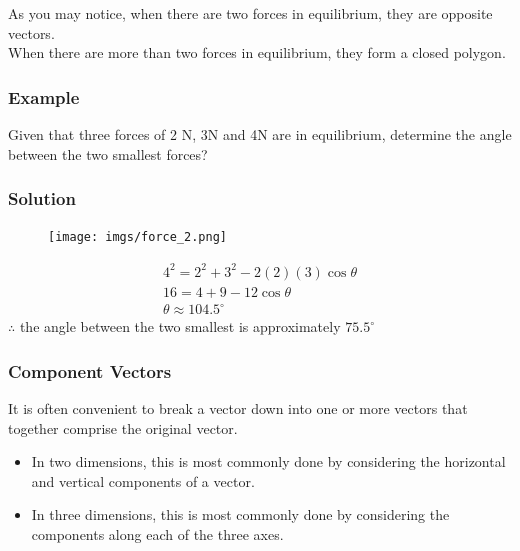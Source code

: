 \documentclass{article}
\begin{document}
As you may notice, when there are two forces in equilibrium, they are opposite vectors.\\
When there are more than two forces in equilibrium, they form a closed polygon.
\subsubsection*{Example}
Given that three forces of 2 N, 3N and 4N are in equilibrium, determine the angle between the two smallest forces?
\subsubsection*{Solution}
\begin{figure}[h]
    \centering
    \texttt{[image: imgs/force\_2.png]}
\end{figure}
\begin{align*}
    4^2=2^2+3^2-2(2)(3)\cos \theta\\
    16=4+9-12\cos \theta\\
    \theta \approx 104.5^{\circ}
\end{align*}
$\therefore$ the angle between the two smallest is approximately $75.5^{\circ}$
\newpage 

\subsubsection{Component Vectors}
It is often convenient to break a vector down into one or more vectors that together comprise the original vector.

\begin{itemize}
    \item In two dimensions, this is most commonly done by considering the horizontal and vertical components of a vector.  
    \item In three dimensions, this is most commonly done by considering the components along each of the three axes.
\end{itemize}
\end{document}
